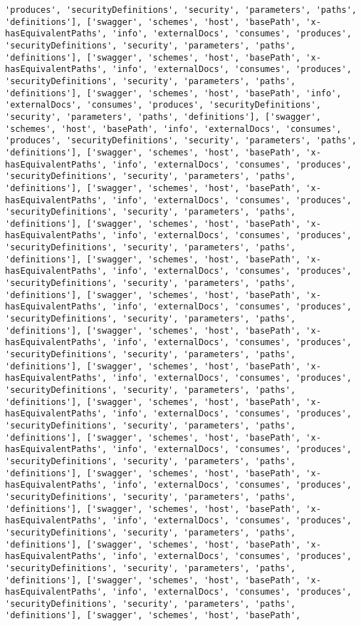 \documentclass[11pt]{article}
\begin{document}
\begin{Verbatim}[commandchars=\\\{\}]
'produces', 'securityDefinitions', 'security', 'parameters', 'paths', 'definitions'], ['swagger', 'schemes', 'host', 'basePath', 'x-hasEquivalentPaths', 'info', 'externalDocs', 'consumes', 'produces', 'securityDefinitions', 'security', 'parameters', 'paths', 'definitions'], ['swagger', 'schemes', 'host', 'basePath', 'x-hasEquivalentPaths', 'info', 'externalDocs', 'consumes', 'produces', 'securityDefinitions', 'security', 'parameters', 'paths', 'definitions'], ['swagger', 'schemes', 'host', 'basePath', 'info', 'externalDocs', 'consumes', 'produces', 'securityDefinitions', 'security', 'parameters', 'paths', 'definitions'], ['swagger', 'schemes', 'host', 'basePath', 'info', 'externalDocs', 'consumes', 'produces', 'securityDefinitions', 'security', 'parameters', 'paths', 'definitions'], ['swagger', 'schemes', 'host', 'basePath', 'x-hasEquivalentPaths', 'info', 'externalDocs', 'consumes', 'produces', 'securityDefinitions', 'security', 'parameters', 'paths', 'definitions'], ['swagger', 'schemes', 'host', 'basePath', 'x-hasEquivalentPaths', 'info', 'externalDocs', 'consumes', 'produces', 'securityDefinitions', 'security', 'parameters', 'paths', 'definitions'], ['swagger', 'schemes', 'host', 'basePath', 'x-hasEquivalentPaths', 'info', 'externalDocs', 'consumes', 'produces', 'securityDefinitions', 'security', 'parameters', 'paths', 'definitions'], ['swagger', 'schemes', 'host', 'basePath', 'x-hasEquivalentPaths', 'info', 'externalDocs', 'consumes', 'produces', 'securityDefinitions', 'security', 'parameters', 'paths', 'definitions'], ['swagger', 'schemes', 'host', 'basePath', 'x-hasEquivalentPaths', 'info', 'externalDocs', 'consumes', 'produces', 'securityDefinitions', 'security', 'parameters', 'paths', 'definitions'], ['swagger', 'schemes', 'host', 'basePath', 'x-hasEquivalentPaths', 'info', 'externalDocs', 'consumes', 'produces', 'securityDefinitions', 'security', 'parameters', 'paths', 'definitions'], ['swagger', 'schemes', 'host', 'basePath', 'x-hasEquivalentPaths', 'info', 'externalDocs', 'consumes', 'produces', 'securityDefinitions', 'security', 'parameters', 'paths', 'definitions'], ['swagger', 'schemes', 'host', 'basePath', 'x-hasEquivalentPaths', 'info', 'externalDocs', 'consumes', 'produces', 'securityDefinitions', 'security', 'parameters', 'paths', 'definitions'], ['swagger', 'schemes', 'host', 'basePath', 'x-hasEquivalentPaths', 'info', 'externalDocs', 'consumes', 'produces', 'securityDefinitions', 'security', 'parameters', 'paths', 'definitions'], ['swagger', 'schemes', 'host', 'basePath', 'x-hasEquivalentPaths', 'info', 'externalDocs', 'consumes', 'produces', 'securityDefinitions', 'security', 'parameters', 'paths', 'definitions'], ['swagger', 'schemes', 'host', 'basePath', 'x-hasEquivalentPaths', 'info', 'externalDocs', 'consumes', 'produces', 'securityDefinitions', 'security', 'parameters', 'paths', 'definitions'], ['swagger', 'schemes', 'host', 'basePath', 'x-hasEquivalentPaths', 'info', 'externalDocs', 'consumes', 'produces', 'securityDefinitions', 'security', 'parameters', 'paths', 'definitions'], ['swagger', 'schemes', 'host', 'basePath', 'x-hasEquivalentPaths', 'info', 'externalDocs', 'consumes', 'produces', 'securityDefinitions', 'security', 'parameters', 'paths', 'definitions'], ['swagger', 'schemes', 'host', 'basePath', 
\end{Verbatim}
\end{document}
